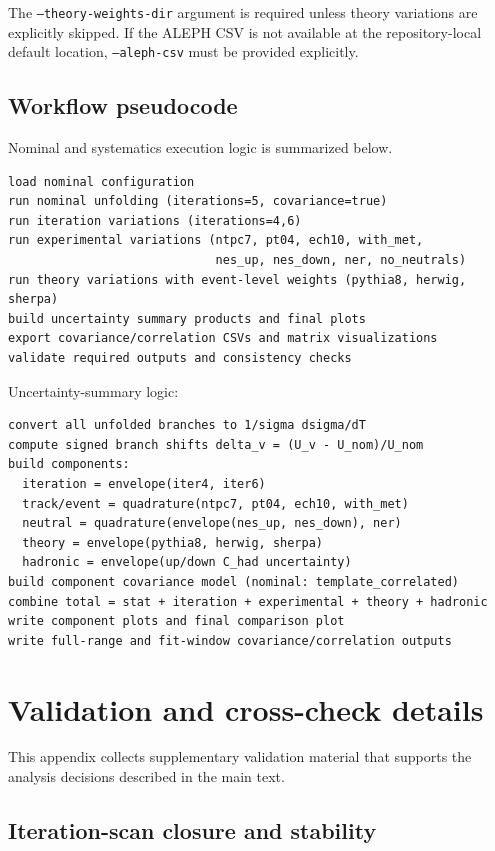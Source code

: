 The \texttt{--theory-weights-dir} argument is required unless theory variations are
explicitly skipped. If the ALEPH CSV is not available at the repository-local default
location, \texttt{--aleph-csv} must be provided explicitly.

\subsection{Workflow pseudocode}

Nominal and systematics execution logic is summarized below.

\begin{verbatim}
load nominal configuration
run nominal unfolding (iterations=5, covariance=true)
run iteration variations (iterations=4,6)
run experimental variations (ntpc7, pt04, ech10, with_met,
                             nes_up, nes_down, ner, no_neutrals)
run theory variations with event-level weights (pythia8, herwig, sherpa)
build uncertainty summary products and final plots
export covariance/correlation CSVs and matrix visualizations
validate required outputs and consistency checks
\end{verbatim}

Uncertainty-summary logic:
\begin{verbatim}
convert all unfolded branches to 1/sigma dsigma/dT
compute signed branch shifts delta_v = (U_v - U_nom)/U_nom
build components:
  iteration = envelope(iter4, iter6)
  track/event = quadrature(ntpc7, pt04, ech10, with_met)
  neutral = quadrature(envelope(nes_up, nes_down), ner)
  theory = envelope(pythia8, herwig, sherpa)
  hadronic = envelope(up/down C_had uncertainty)
build component covariance model (nominal: template_correlated)
combine total = stat + iteration + experimental + theory + hadronic
write component plots and final comparison plot
write full-range and fit-window covariance/correlation outputs
\end{verbatim}

\section{Validation and cross-check details}
\label{sec:app_validation}

This appendix collects supplementary validation material that supports the analysis decisions described in the main text.

\subsection{Iteration-scan closure and stability}

